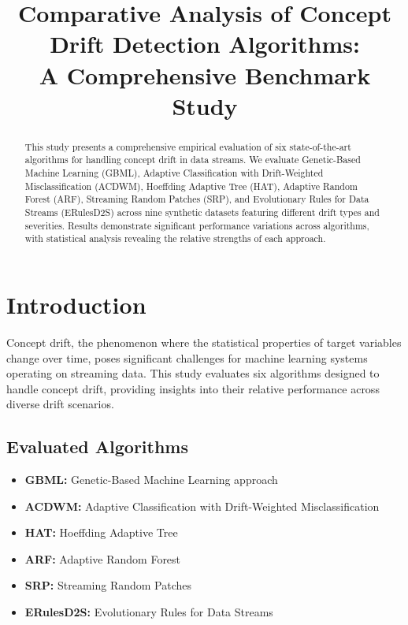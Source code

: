 \documentclass[conference]{IEEEtran}
\begin{document}
\title{Comparative Analysis of Concept Drift Detection Algorithms:\\
A Comprehensive Benchmark Study}

\author{
}

\maketitle

\begin{abstract}
This study presents a comprehensive empirical evaluation of six state-of-the-art algorithms for handling concept drift in data streams. We evaluate Genetic-Based Machine Learning (GBML), Adaptive Classification with Drift-Weighted Misclassification (ACDWM), Hoeffding Adaptive Tree (HAT), Adaptive Random Forest (ARF), Streaming Random Patches (SRP), and Evolutionary Rules for Data Streams (ERulesD2S) across nine synthetic datasets featuring different drift types and severities. Results demonstrate significant performance variations across algorithms, with statistical analysis revealing the relative strengths of each approach.
\end{abstract}

\section{Introduction}

Concept drift, the phenomenon where the statistical properties of target variables change over time, poses significant challenges for machine learning systems operating on streaming data. This study evaluates six algorithms designed to handle concept drift, providing insights into their relative performance across diverse drift scenarios.

\subsection{Evaluated Algorithms}

\begin{itemize}
\item \textbf{GBML:} Genetic-Based Machine Learning approach
\item \textbf{ACDWM:} Adaptive Classification with Drift-Weighted Misclassification
\item \textbf{HAT:} Hoeffding Adaptive Tree
\item \textbf{ARF:} Adaptive Random Forest
\item \textbf{SRP:} Streaming Random Patches
\item \textbf{ERulesD2S:} Evolutionary Rules for Data Streams
\end{itemize}
\end{document}
